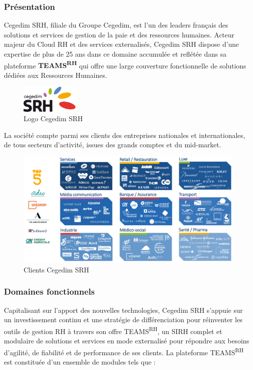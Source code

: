 \subsubsection{Présentation}
Cegedim SRH, filiale du Groupe Cegedim, est l'un des leaders français des solutions et services de gestion de la paie et des ressources humaines. Acteur majeur du Cloud RH et des services externalisés, 
Cegedim SRH dispose d'une expertise de plus de 25 ans dans ce domaine accumulée et reflétée dans sa plateforme \textbf{TEAMS\textsuperscript{RH}} qui offre une large couverture fonctionnelle de solutions dédiées aux Ressources Humaines.\\
\begin{figure}[H]
    \centering
    \includegraphics[width=0.25\textwidth]{images/sec1/cegedim-srh.pdf}
    \caption{Logo Cegedim SRH}
\end{figure}
La société compte parmi ses clients des entreprises nationales et internationales, de tous secteurs d’activité, issues des grands comptes et du mid-market.
\begin{figure}[H]
    \centering
    \includegraphics[width=\textwidth]{images/sec1/clients-cegedim-srh.pdf}
    \caption{Clients Cegedim SRH}
\end{figure}
\subsubsection{Domaines fonctionnels}
Capitalisant sur l'apport des nouvelles technologies, Cegedim SRH s'appuie sur un investissement continu et une stratégie de différenciation pour réinventer les outils de gestion RH à travers son offre TEAMS\textsuperscript{RH}, un SIRH complet et modulaire de solutions et services en mode externalisé pour répondre aux besoins d'agilité, de fiabilité et de performance de ses clients.
La plateforme TEAMS\textsuperscript{RH} est constituée d'un ensemble de modules tels que :

